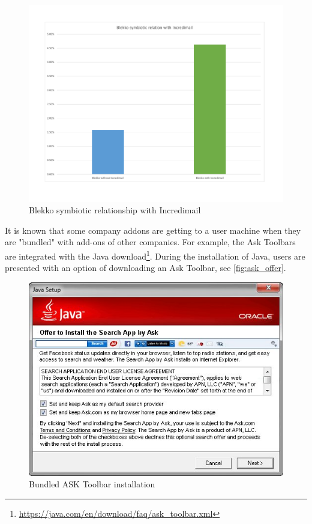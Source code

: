 \documentclass[11pt,oneside]{book}
\begin{document}
\begin{figure}[h]
\centering
\includegraphics[width=\linewidth]{figures/blekko_sym_incredi.pdf}
\caption{Blekko symbiotic relationship with Incredimail}
\label{fig:blekko_sym_incredi}
\end{figure}


It is known that some company addons are getting to a user machine when they are "bundled" with add-ons of other companies. For example, the Ask Toolbars are integrated with the Java download\footnote{\url{https://java.com/en/download/faq/ask_toolbar.xml}}. During the installation of Java, users are presented with an option of downloading an Ask Toolbar, see \autoref{fig:ask_offer}.
\begin{figure}[h]
\centering
\includegraphics[scale=.8,angle=0]{figures/ask_offer.png}
\caption{Bundled ASK Toolbar installation}
\label{fig:ask_offer}
\end{figure}
\end{document}

